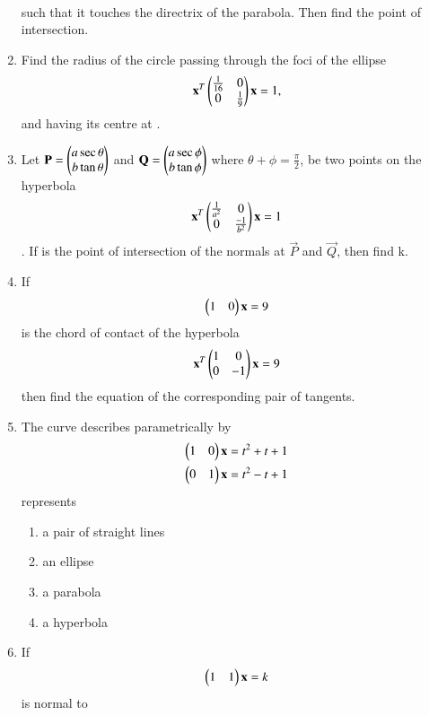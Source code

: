 \documentclass[journal,12pt,twocolumn]{IEEEtran}
\begin{document}
\begin{enumerate}[label=\arabic*]
\begin{align}
	\end{align}
	such that it touches the directrix of the parabola. Then find the point of intersection.
\item Find the radius of the circle passing through the foci of the ellipse 
	\begin{align}
	\mathbf {x}^T \begin{pmatrix}\frac{1}{16}&0 \\ 0&\frac{1}{9}\end{pmatrix}\mathbf {x}=1,
	\end{align} and having its centre at . 
\item Let $\mathbf{P} = \begin{pmatrix}a\sec\theta \\ b\tan\theta\end{pmatrix}$
	and $\mathbf{Q}=\begin{pmatrix}a\sec\phi \\ b\tan\phi\end{pmatrix}$ where $\theta+\phi=\frac{\pi}{2}$, be two points on  the hyperbola 
    \begin{align}
    \mathbf{x}^T \begin{pmatrix} \frac{1}{a^2}&0 \\ 0&\frac{-1}{b^2}\end{pmatrix}\mathbf {x}=1
    \end{align}. If  is the point of intersection of the normals at $\vec{P}$ and 
    $\vec{Q}$, then find k.
\item If 
	\begin{align}
    \begin{pmatrix}1&0\end{pmatrix}\mathbf {x}=9
    \end{align} is the chord of contact of the hyperbola 
    \begin{align}
    \mathbf {x}^T \begin{pmatrix}1&0 \\ 0&-1\end{pmatrix}\mathbf {x}=9
    \end{align} then find the equation of the corresponding pair of tangents.
\item The curve describes parametrically by 
    \begin{align}
    \begin{pmatrix}1&0\end{pmatrix}\mathbf {x}=t^2+t+1\\
    \begin{pmatrix}0&1\end{pmatrix}\mathbf {x}=t^2-t+1
    \end{align} represents
    \begin{enumerate}
    \item a pair of straight lines 
    \item an ellipse
    \item a parabola
    \item a hyperbola
    \end{enumerate}
\item If 
	\begin{align}
    \begin{pmatrix}1&1\end{pmatrix}\mathbf{x}=k
    \end{align} is normal to 

\end{enumerate}
\end{document}
